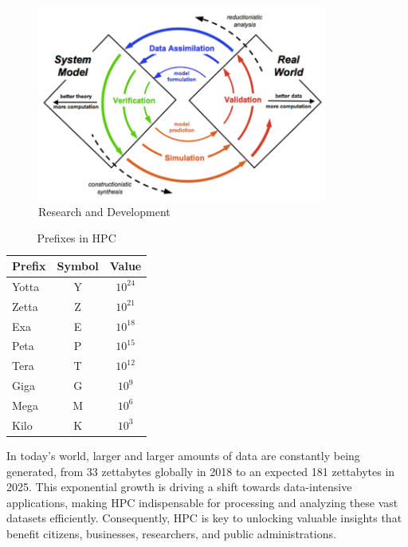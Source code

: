 \begin{minipage}[H]{0.6\textwidth}
    \begin{figure}[H]
        \centering
        \includegraphics[width=0.85\textwidth]{assets/research.png}
        \caption{Research and Development}
        \label{fig:research}
    \end{figure}
\end{minipage}%
\begin{minipage}[H]{0.4\textwidth}
    \begin{table}[H]
        \centering
        \renewcommand{\arraystretch}{1.15}
        \begin{tabular}{lcc}
            \hline
            \textbf{Prefix} & \textbf{Symbol} & \textbf{Value} \\
            \hline
            Yotta & Y & $10^{24}$ \\
            Zetta & Z & $10^{21}$ \\
            Exa & E & $10^{18}$ \\
            Peta & P & $10^{15}$ \\
            Tera & T & $10^{12}$ \\
            Giga & G & $10^9$ \\
            Mega & M & $10^6$ \\
            Kilo & K & $10^3$ \\
            \hline
        \end{tabular}
        \caption{Prefixes in HPC}
    \end{table}
\end{minipage}

\begin{observationblock}
In today’s world, larger and larger amounts of data are constantly being generated, from 33 zettabytes globally in 2018 to an expected 181 zettabytes in 2025. This exponential growth is driving a shift towards data-intensive applications, making HPC indispensable for processing and analyzing these vast datasets efficiently. Consequently, HPC is key to unlocking valuable insights that benefit citizens, businesses, researchers, and public administrations. \cite{europaHighPerformance}
\end{observationblock}

